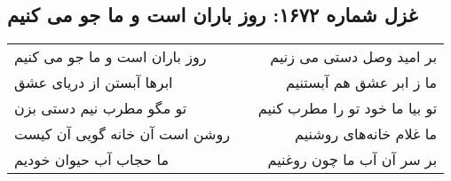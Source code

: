 \begin{center}
\section*{غزل شماره ۱۶۷۲: روز باران است و ما جو می کنیم}
\label{sec:1672}
\begin{longtable}{l p{0.5cm} r}
روز باران است و ما جو می کنیم
&&
بر امید وصل دستی می زنیم
\\
ابرها آبستن از دریای عشق
&&
ما ز ابر عشق هم آبستنیم
\\
تو مگو مطرب نیم دستی بزن
&&
تو بیا ما خود تو را مطرب کنیم
\\
روشن است آن خانه گویی آن کیست
&&
ما غلام خانه‌های روشنیم
\\
ما حجاب آب حیوان خودیم
&&
بر سر آن آب ما چون روغنیم
\\
\end{longtable}
\end{center}
